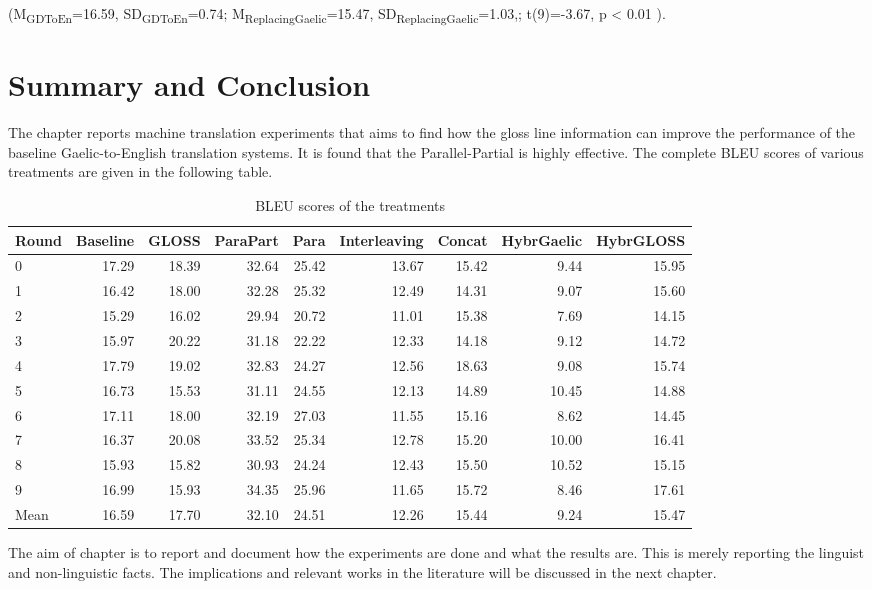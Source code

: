 \documentclass[a4paper]{article}
\begin{document}
(M\textsubscript{GDToEn}=16.59, SD\textsubscript{GDToEn}=0.74; M\textsubscript{ReplacingGaelic}=15.47, SD\textsubscript{ReplacingGaelic}=1.03,; t(9)=-3.67, p < 0.01 ).


\section{Summary and Conclusion}
The chapter reports machine translation experiments that aims to find how the gloss line information can improve the performance of the baseline Gaelic-to-English translation systems. It is found that the Parallel-Partial is highly effective. The complete BLEU scores of various treatments are given in the following table. 
\begin{table}[ht]
\centering
\begin{tabular}{lrrrrrrrr}
  \hline
Round & Baseline & GLOSS & ParaPart & Para & Interleaving & Concat & HybrGaelic & HybrGLOSS \\ 
  \hline
0 & 17.29 & 18.39 & 32.64 & 25.42 & 13.67 & 15.42 & 9.44 & 15.95 \\ 
  1 & 16.42 & 18.00 & 32.28 & 25.32 & 12.49 & 14.31 & 9.07 & 15.60 \\ 
  2 & 15.29 & 16.02 & 29.94 & 20.72 & 11.01 & 15.38 & 7.69 & 14.15 \\ 
  3 & 15.97 & 20.22 & 31.18 & 22.22 & 12.33 & 14.18 & 9.12 & 14.72 \\ 
  4 & 17.79 & 19.02 & 32.83 & 24.27 & 12.56 & 18.63 & 9.08 & 15.74 \\ 
  5 & 16.73 & 15.53 & 31.11 & 24.55 & 12.13 & 14.89 & 10.45 & 14.88 \\ 
  6 & 17.11 & 18.00 & 32.19 & 27.03 & 11.55 & 15.16 & 8.62 & 14.45 \\ 
  7 & 16.37 & 20.08 & 33.52 & 25.34 & 12.78 & 15.20 & 10.00 & 16.41 \\ 
  8 & 15.93 & 15.82 & 30.93 & 24.24 & 12.43 & 15.50 & 10.52 & 15.15 \\ 
  9 & 16.99 & 15.93 & 34.35 & 25.96 & 11.65 & 15.72 & 8.46 & 17.61 \\ 
   \hline
Mean & 16.59 & 17.70 & 32.10 & 24.51 & 12.26 & 15.44 & 9.24 & 15.47 \\ 
   \hline
\end{tabular}
\caption{BLEU scores of the treatments} 
\label{table:complete_table}
\end{table}
The aim of chapter is to report and document how the experiments are done and what the results are. This is merely reporting the linguist and non-linguistic facts. The implications and relevant works in the literature will be discussed in the next chapter.   
\end{document}
